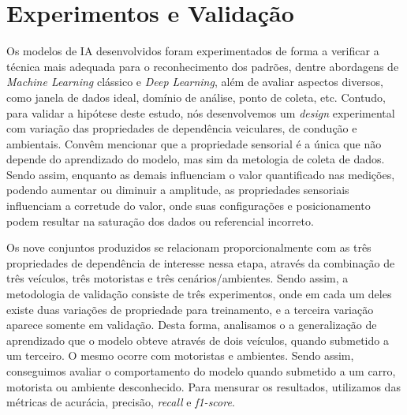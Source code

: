 \section{Experimentos e Validação}

Os modelos de IA desenvolvidos foram experimentados de forma a verificar a técnica mais adequada para o reconhecimento dos padrões, dentre abordagens de \textit{Machine Learning} clássico e \textit{Deep Learning}, além de avaliar aspectos diversos, como janela de dados ideal, domínio de análise, ponto de coleta, etc. Contudo, para validar a hipótese deste estudo, nós desenvolvemos um \textit{design} experimental com variação das propriedades de dependência veiculares, de condução e ambientais. Convêm mencionar que a propriedade sensorial é a única que não depende do aprendizado do modelo, mas sim da metologia de coleta de dados. Sendo assim, enquanto as demais influenciam o valor quantificado nas medições, podendo aumentar ou diminuir a amplitude, as propriedades sensoriais influenciam a corretude do valor, onde suas configurações e posicionamento podem resultar na saturação dos dados ou referencial incorreto.
 
Os nove conjuntos produzidos se relacionam proporcionalmente com as três propriedades de dependência de interesse nessa etapa, através da combinação de três veículos, três motoristas e três cenários/ambientes. Sendo assim, a metodologia de validação consiste de três experimentos, onde em cada um deles existe duas variações de propriedade para treinamento, e a terceira variação aparece somente em validação. Desta forma, analisamos o a generalização de aprendizado que o modelo obteve através de dois veículos, quando submetido a um terceiro. O mesmo ocorre com motoristas e ambientes. Sendo assim, conseguimos avaliar o comportamento do modelo quando submetido a um carro, motorista ou ambiente desconhecido. Para mensurar os resultados, utilizamos das métricas de acurácia, precisão, \textit{recall} e \textit{f1-score}.